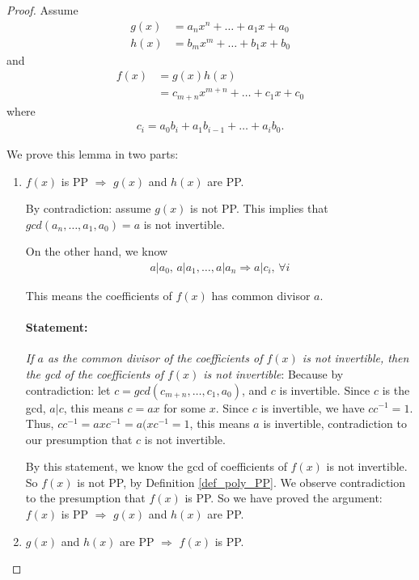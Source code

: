\documentclass[utf8]{ctexbook}
\theoremstyle{definition}
\begin{document}
\begin{proof}
Assume
\begin{align*}
g(x) &= a_n x^n + \ldots + a_1 x + a_0 \\
h(x) &= b_m x^m + \ldots + b_1 x + b_0
\end{align*}
and
\begin{align*}
f(x) &= g(x) h(x) \\
&= c_{m+n} x^{m+n} + \ldots + c_1 x + c_0
\end{align*}
where
\begin{align*}
c_i = a_0 b_i + a_1 b_{i-1} + \ldots + a_i b_0 .
\end{align*}

We prove this lemma in two parts:
\begin{enumerate}
\item{$f(x)$ is PP $\Longrightarrow$ $g(x)$ and $h(x)$ are PP. 

By contradiction: assume $g(x)$ is not PP. This implies that $gcd(a_n, \ldots, a_1, a_0) = a$ is not invertible.

On the other hand, we know
\begin{align*}
a | a_0, \, a| a_1, \ldots, a | a_n \Longrightarrow a | c_i, \, \forall i
\end{align*}

This means the coefficients of $f(x)$ has common divisor $a$. 

\paragraph{Statement:} \emph{If $a$ as the common divisor of the coefficients of $f(x)$ is not invertible, then the gcd of the coefficients of $f(x)$ is not invertible}: Because by contradiction: let $c = gcd(c_{m+n}, \ldots, c_1, a_0)$, and $c$ is invertible. Since $c$ is the gcd, $a | c$, this means $c = a x $ for some $x$. Since $c$ is invertible, we have $c c^{-1} = 1$. Thus, $c c^{-1} = a x c^{-1} = a ( x c^{-1} = 1$, this means $a$ is invertible, contradiction to our presumption that $c$ is not invertible.

By this statement, we know the gcd of coefficients of $f(x)$ is not invertible. So $f(x)$ is not PP, by Definition \ref{def_poly_PP}. We observe contradiction to the presumption that $f(x)$ is PP. So we have proved the argument: $f(x)$ is PP $\Longrightarrow$ $g(x)$ and $h(x)$ are PP.

}
\item{$g(x)$ and $h(x)$ are PP $\Longrightarrow$ $f(x)$ is PP.

}
\end{enumerate}
\end{proof}
\end{document}
